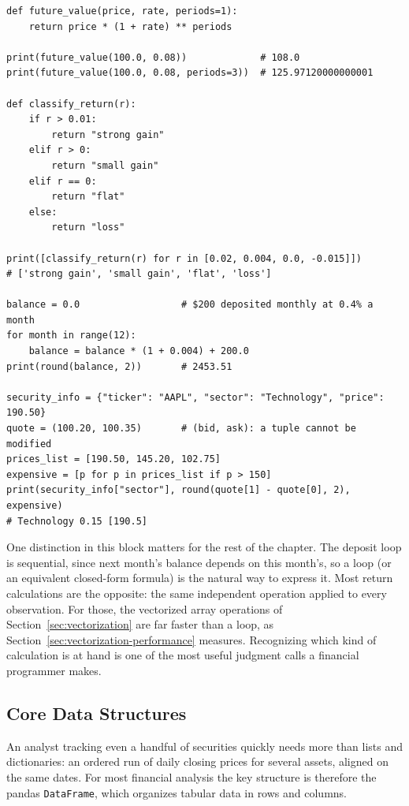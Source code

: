 \documentclass[../ai_in_finance]{subfiles}
\begin{document}
\begin{verbatim}
def future_value(price, rate, periods=1):
    return price * (1 + rate) ** periods

print(future_value(100.0, 0.08))             # 108.0
print(future_value(100.0, 0.08, periods=3))  # 125.97120000000001

def classify_return(r):
    if r > 0.01:
        return "strong gain"
    elif r > 0:
        return "small gain"
    elif r == 0:
        return "flat"
    else:
        return "loss"

print([classify_return(r) for r in [0.02, 0.004, 0.0, -0.015]])
# ['strong gain', 'small gain', 'flat', 'loss']

balance = 0.0                  # $200 deposited monthly at 0.4% a month
for month in range(12):
    balance = balance * (1 + 0.004) + 200.0
print(round(balance, 2))       # 2453.51

security_info = {"ticker": "AAPL", "sector": "Technology", "price": 190.50}
quote = (100.20, 100.35)       # (bid, ask): a tuple cannot be modified
prices_list = [190.50, 145.20, 102.75]
expensive = [p for p in prices_list if p > 150]
print(security_info["sector"], round(quote[1] - quote[0], 2), expensive)
# Technology 0.15 [190.5]
\end{verbatim}

One distinction in this block matters for the rest of the chapter. The deposit loop is sequential, since next month's balance depends on this month's, so a loop (or an equivalent closed-form formula) is the natural way to express it. Most return calculations are the opposite: the same independent operation applied to every observation. For those, the vectorized array operations of Section~\ref{sec:vectorization} are far faster than a loop, as Section~\ref{sec:vectorization-performance} measures. Recognizing which kind of calculation is at hand is one of the most useful judgment calls a financial programmer makes.

\subsection{Core Data Structures}
\label{sec:python-data-structures}

An analyst tracking even a handful of securities quickly needs more than lists and dictionaries: an ordered run of daily closing prices for several assets, aligned on the same dates. For most financial analysis the key structure is therefore the pandas \texttt{DataFrame}, which organizes tabular data in rows and columns.
\end{document}
